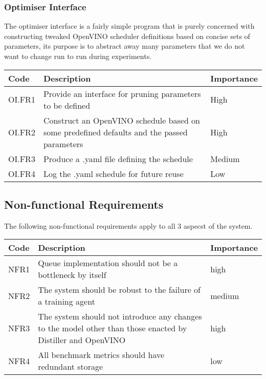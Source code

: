 \documentclass[../../D1.tex]{subfiles}
\begin{document}
\subsubsection{Optimiser Interface}
The optimiser interface is a fairly simple program that is purely concerned with constructing tweaked OpenVINO scheduler definitions based on concise sets of parameters, its purpose is to abstract away many parameters that we do not want to change run to run during experiments.
\begin{table}[h]
    \begin{tabular}{@{}l|p{10cm}|l@{}}
    \toprule
    Code   & Description                                                                                & Importance \\ \midrule
    OI.FR1 & Provide an interface for pruning parameters to be defined                                  & High       \\
    OI.FR2 & Construct an OpenVINO schedule based on some predefined defaults and the passed parameters & High       \\
    OI.FR3 & Produce a .yaml file defining the schedule                                                 & Medium     \\
    OI.FR4 & Log the .yaml schedule for future reuse                                                    & Low        \\ \bottomrule
    \end{tabular}
\end{table}


\subsection{Non-functional Requirements}
The following non-functional requirements apply to all 3 aspecst of the system.

\begin{table}[H]
    \begin{tabular}{l|p{10cm}|l}
    \hline
    Code & Description                                                                                                 & Importance \\ \hline
    NFR1 & Queue implementation should not be a bottleneck by itself                                                   & high       \\
    NFR2 & The system should be robust to the failure of a training agent                                              & medium     \\
    NFR3 & The system should not introduce any changes to the model other than those enacted by Distiller and OpenVINO & high       \\
    NFR4 & All benchmark metrics should have redundant storage                                                         & low        \\ \hline
    \end{tabular}
    \end{table}
\end{document}
